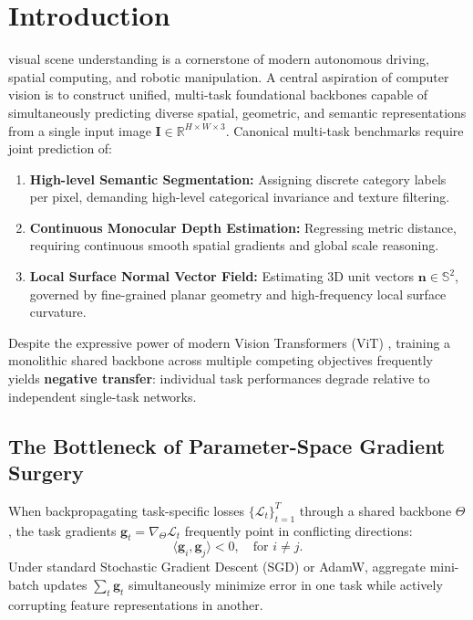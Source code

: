 \documentclass[10pt,journal,compsoc]{IEEEtran}
\begin{document}
\maketitle
\IEEEdisplaynontitleabstractindextext
\IEEEpeerreviewmaketitle

\section{Introduction}
\label{sec:introduction}

 visual scene understanding is a cornerstone of modern autonomous driving, spatial computing, and robotic manipulation. A central aspiration of computer vision is to construct unified, multi-task foundational backbones capable of simultaneously predicting diverse spatial, geometric, and semantic representations from a single input image $\mathbf{I} \in \mathbb{R}^{H \times W \times 3}$. Canonical multi-task benchmarks require joint prediction of:
\begin{enumerate}
    \item \textbf{High-level Semantic Segmentation:} Assigning discrete category labels per pixel, demanding high-level categorical invariance and texture filtering.
    \item \textbf{Continuous Monocular Depth Estimation:} Regressing metric distance, requiring continuous smooth spatial gradients and global scale reasoning.
    \item \textbf{Local Surface Normal Vector Field:} Estimating 3D unit vectors $\mathbf{n} \in \mathbb{S}^2$, governed by fine-grained planar geometry and high-frequency local surface curvature.
\end{enumerate}

Despite the expressive power of modern Vision Transformers (ViT) \cite{dosovitskiy2020image, liu2021swin}, training a monolithic shared backbone across multiple competing objectives frequently yields \textbf{negative transfer}: individual task performances degrade relative to independent single-task networks.

\subsection{The Bottleneck of Parameter-Space Gradient Surgery}
When backpropagating task-specific losses $\{\mathcal{L}_t\}_{t=1}^T$ through a shared backbone $\Theta$, the task gradients $\mathbf{g}_t = \nabla_\Theta \mathcal{L}_t$ frequently point in conflicting directions:
\begin{equation}
\langle \mathbf{g}_i, \mathbf{g}_j \rangle < 0, \quad \text{for } i \neq j.
\end{equation}
Under standard Stochastic Gradient Descent (SGD) or AdamW, aggregate mini-batch updates $\sum_t \mathbf{g}_t$ simultaneously minimize error in one task while actively corrupting feature representations in another.
\end{document}
